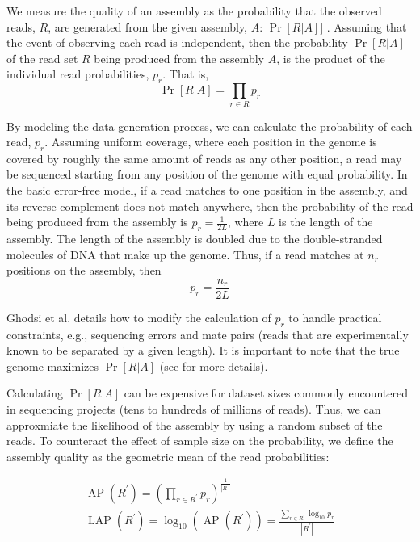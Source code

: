 \documentclass[conference]{IEEEtran}
\begin{document}
We measure the quality of an assembly as the probability that the observed reads, $R$, are generated from the given assembly, $A$: $\Pr[R|A]]$ \cite{LAP}.
Assuming that the event of observing each read is independent, then the probability $\Pr[R|A]$ of the read set $R$ being produced from the assembly $A$, is the product of the individual read probabilities, $p_r$.  That is,
\begin{equation}
  \label{probability_reads_given_assembly}
  \Pr[R \vert A]=\prod_{r \in R} p_r
\end{equation}

By modeling the data generation process, we can calculate the probability of each read, $p_r$.
Assuming uniform coverage, where each position in the genome is covered by roughly the same amount of reads as any other position, a read may be sequenced starting from any position of the genome with equal probability.
In the basic error-free model, if a read matches to one position in the assembly, and its reverse-complement does not match anywhere, then the probability of the read being produced from the assembly is $p_r=\frac{1}{2L}$, where $L$ is the length of the assembly.
The length of the assembly is doubled due to the double-stranded molecules of DNA that make up the genome.
Thus, if a read 
matches at $n_r$ positions on the assembly, then
\begin{equation}
  \label{error_free_probability}
  p_r = \frac{n_r}{2L}
\end{equation}

Ghodsi et al. details how to modify the calculation of $p_r$ to handle practical constraints, e.g., sequencing errors and mate pairs (reads that are experimentally known to be separated by a given length).
It is important to note that the true genome maximizes $\Pr[R|A]$ (see \cite{LAP} for more details).

Calculating $\Pr[R|A]$ can be expensive for dataset sizes commonly encountered in sequencing projects (tens to hundreds of millions of reads).
Thus, we can approxmiate the likelihood of the assembly by using a random subset of the reads.
To counteract the effect of sample size on the probability, we define the assembly quality as the geometric mean of the read probabilities:

\begin{align}
\label{average_log_probability}
  \operatorname{AP}(R^\prime) = 
  \left(\prod_{r \in R^\prime} p_r\right)^{\frac{1}{\left|R^\prime\right|}} \nonumber  \\
  \operatorname{LAP}(R^\prime) = \log_{10} \left( \operatorname{AP}(R^\prime) \right) = \frac{\sum_{r \in R^\prime} \log_{10} p_r}{\left|R^\prime\right|}
\end{align}
\end{document}
